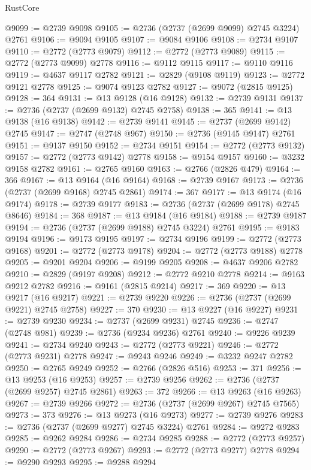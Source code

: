 \begin{lexlean}{RustCore}
\begin{coremodule}
@9099 := @2739 @9098
@9105 := @2736 (@2737 (@2699 @9099) @2745 @3224) @2761
@9106 := @9094 @9105
@9107 := @9084 @9106
@9108 := @2734 @9107
@9110 := @2772 (@2773 @9079)
@9112 := @2772 (@2773 @9089)
@9115 := @2772 (@2773 @9099) @2778
@9116 := @9112 @9115
@9117 := @9110 @9116
@9119 := @4637 @9117 @2782
@9121 := @2829 (@9108 @9119)
@9123 := @2772 @9121 @2778
@9125 := @9074 @9123 @2782
@9127 := @9072 (@2815 @9125)
@9128 := 364
@9131 := @13 @9128 (@16 @9128)
@9132 := @2739 @9131
@9137 := @2736 (@2737 (@2699 @9132) @2745 @2758)
@9138 := 365
@9141 := @13 @9138 (@16 @9138)
@9142 := @2739 @9141
@9145 := @2737 (@2699 @9142) @2745
@9147 := @2747 (@2748 @967)
@9150 := @2736 (@9145 @9147) @2761
@9151 := @9137 @9150
@9152 := @2734 @9151
@9154 := @2772 (@2773 @9132)
@9157 := @2772 (@2773 @9142) @2778
@9158 := @9154 @9157
@9160 := @3232 @9158 @2782
@9161 := @2765 @9160
@9163 := @2766 (@2826 @479)
@9164 := 366
@9167 := @13 @9164 (@16 @9164)
@9168 := @2739 @9167
@9173 := @2736 (@2737 (@2699 @9168) @2745 @2861)
@9174 := 367
@9177 := @13 @9174 (@16 @9174)
@9178 := @2739 @9177
@9183 := @2736 (@2737 (@2699 @9178) @2745 @8646)
@9184 := 368
@9187 := @13 @9184 (@16 @9184)
@9188 := @2739 @9187
@9194 := @2736 (@2737 (@2699 @9188) @2745 @3224) @2761
@9195 := @9183 @9194
@9196 := @9173 @9195
@9197 := @2734 @9196
@9199 := @2772 (@2773 @9168)
@9201 := @2772 (@2773 @9178)
@9204 := @2772 (@2773 @9188) @2778
@9205 := @9201 @9204
@9206 := @9199 @9205
@9208 := @4637 @9206 @2782
@9210 := @2829 (@9197 @9208)
@9212 := @2772 @9210 @2778
@9214 := @9163 @9212 @2782
@9216 := @9161 (@2815 @9214)
@9217 := 369
@9220 := @13 @9217 (@16 @9217)
@9221 := @2739 @9220
@9226 := @2736 (@2737 (@2699 @9221) @2745 @2758)
@9227 := 370
@9230 := @13 @9227 (@16 @9227)
@9231 := @2739 @9230
@9234 := @2737 (@2699 @9231) @2745
@9236 := @2747 (@2748 @981)
@9239 := @2736 (@9234 @9236) @2761
@9240 := @9226 @9239
@9241 := @2734 @9240
@9243 := @2772 (@2773 @9221)
@9246 := @2772 (@2773 @9231) @2778
@9247 := @9243 @9246
@9249 := @3232 @9247 @2782
@9250 := @2765 @9249
@9252 := @2766 (@2826 @516)
@9253 := 371
@9256 := @13 @9253 (@16 @9253)
@9257 := @2739 @9256
@9262 := @2736 (@2737 (@2699 @9257) @2745 @2861)
@9263 := 372
@9266 := @13 @9263 (@16 @9263)
@9267 := @2739 @9266
@9272 := @2736 (@2737 (@2699 @9267) @2745 @7565)
@9273 := 373
@9276 := @13 @9273 (@16 @9273)
@9277 := @2739 @9276
@9283 := @2736 (@2737 (@2699 @9277) @2745 @3224) @2761
@9284 := @9272 @9283
@9285 := @9262 @9284
@9286 := @2734 @9285
@9288 := @2772 (@2773 @9257)
@9290 := @2772 (@2773 @9267)
@9293 := @2772 (@2773 @9277) @2778
@9294 := @9290 @9293
@9295 := @9288 @9294

\end{coremodule}
\end{lexlean}
